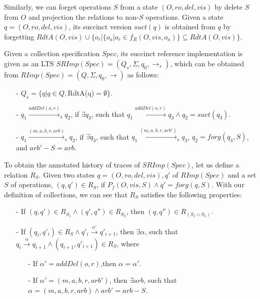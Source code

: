 Similarly, we can forget operations $S$ from a state $(O,\mathit{ro},\mathit{del},\mathit{vis})$ by delete $S$ from $O$ and projection the relations to non-$S$ operations. Given a state $q = (O,\mathit{ro},\mathit{del},\mathit{vis})$, its succinct version $suct(q)$ is obtained from $q$ by forgetting $RdtA(O,\mathit{vis}) \cup \{ o_r \vert  \{ o_a \vert o_r \in f_R(O,\mathit{vis},o_a) \} \subseteq RdtA(O,\mathit{vis}) \}$. %

Given a collection specification $Spec$, its succinct reference implementation is given as an LTS $SRImp(Spec) = (Q_s,\Sigma,q_0,\rightarrow_s)$, which can be obtained from $RImp(Spec) = (Q,\Sigma,q_0,\rightarrow)$ as follows: %

\begin{itemize}
\setlength{\itemsep}{0.5pt}
\item[-] $Q_s = \{ q \vert q \in Q, $RdtA(q)$ = \emptyset \}$.

\item[-] $q_1 {\xrightarrow{addDel(o,r)}}_s q_2$, if $\exists q_3$, such that $q_1 {\xrightarrow{addDel(o,r)}} q_3 \wedge q_2 = suct(q_3)$.

\item[-] $q_1 {\xrightarrow{(m,a,b,r,\mathit{arb})}}_s q_2$, if $\exists q_3$, such that $q_1 {\xrightarrow{(m,a,b,r,\mathit{arb}')}}_s q_3$, $q_2 = forg(q_3,S)$, and $\mathit{arb}' - S = \mathit{arb}$.
\end{itemize}

To obtain the annotated history of traces of $SRImp(Spec)$, let us define a relation $R_S$. Given two states $q=(O,\mathit{ro},\mathit{del},\mathit{vis}),q'$ of $RImp(Spec)$ and a set $S$ of operations, $(q,q') \in R_S$, if $P_f(O,\mathit{vis},S) \wedge q' = forg(q,S)$. With our definition of collections, we can see that $R_S$ satisfies the following properties:

\begin{itemize}
\setlength{\itemsep}{0.5pt}
\item[-] If $(q,q') \in R_{ S_1 } \wedge (q',q'') \in R_{ S_2 }$, then $(q,q'') \in R_{ ( S_1 \cup S_2 ) }$.

\item[-] If $(q_i,q'_i) \in R_{S} \wedge q'_i {\xrightarrow{\alpha'}} q'_{i+1}$, then $\exists \alpha$, such that $q_i {\xrightarrow{\alpha}} q_{i+1} \wedge (q_{i+1},q'_{i+1}) \in R_{S}$, where

    \begin{itemize}
    \setlength{\itemsep}{0.5pt}
    \item[-] If $\alpha' = addDel(o,r)$,then $\alpha = \alpha'$.

    \item[-] If $\alpha'=(m,a,b,r,\mathit{arb}')$, then $\exists \mathit{arb}$, such that $\alpha=(m,a,b,r,\mathit{arb}) \wedge \mathit{arb}' = \mathit{arb} - S$.
    \end{itemize}
\end{itemize}


